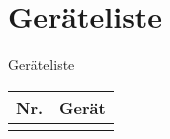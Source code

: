 \section{Geräteliste}
\label{sec:geraeteliste}
\begin{tabelle}
	\caption{Geräteliste}
	\label{tab:geraeteliste}
	\begin{tabular}{|c|K{3.5\tablewidth}|}
		\hline {}
		Nr. & Gerät \\
		\hline
		
	\end{tabular}
\end{tabelle}